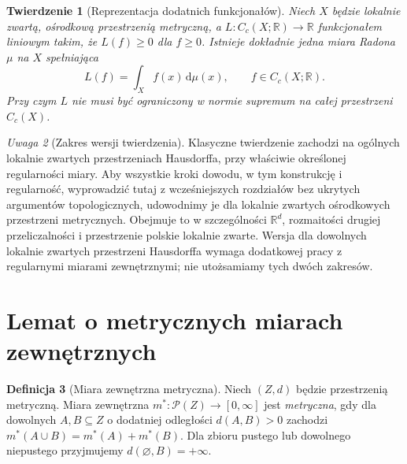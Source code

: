\documentclass[11pt,a4paper,oneside]{book}
\numberwithin{equation}{chapter}
\theoremstyle{plain}
\newtheorem{twierdzenie}{Twierdzenie}[chapter]
\theoremstyle{definition}
\newtheorem{definicja}[twierdzenie]{Definicja}
\theoremstyle{remark}
\newtheorem{uwaga}[twierdzenie]{Uwaga}
\begin{document}
\begin{twierdzenie}[Reprezentacja dodatnich funkcjonałów]
\label{thm:riesz-positive-21}
Niech $X$ będzie \emph{lokalnie zwartą, ośrodkową przestrzenią
metryczną}, a $L:C_c(X;\mathbb R)\to\mathbb R$ funkcjonałem
liniowym takim, że $L(f)\ge0$ dla $f\ge0$.
Istnieje dokładnie jedna miara Radona $\mu$ na $X$ spełniająca
\begin{equation}\label{eq:riesz-representation-21}
 L(f)=\int_X f(x)\,\mathrm d\mu(x),\qquad f\in C_c(X;\mathbb R).
\end{equation}
Przy czym $L$ nie musi być ograniczony w normie supremum na
całej przestrzeni $C_c(X)$.
\end{twierdzenie}

\begin{uwaga}[Zakres wersji twierdzenia]
Klasyczne twierdzenie zachodzi na ogólnych lokalnie zwartych
przestrzeniach Hausdorffa, przy właściwie określonej regularności
miary. Aby wszystkie kroki dowodu, w tym konstrukcję i regularność,
wyprowadzić tutaj z wcześniejszych rozdziałów bez ukrytych
argumentów topologicznych, udowodnimy je dla lokalnie zwartych
ośrodkowych przestrzeni metrycznych. Obejmuje to w szczególności
$\mathbb R^d$, rozmaitości drugiej przeliczalności i przestrzenie
polskie lokalnie zwarte. Wersja dla dowolnych lokalnie zwartych
przestrzeni Hausdorffa wymaga dodatkowej pracy z regularnymi
miarami zewnętrznymi; nie utożsamiamy tych dwóch zakresów.
\end{uwaga}

\section{Lemat o metrycznych miarach zewnętrznych}
\begin{definicja}[Miara zewnętrzna metryczna]
\label{def:metric-outer-21}
Niech $(Z,d)$ będzie przestrzenią metryczną.
Miara zewnętrzna $m^*:\mathcal P(Z)\to[0,\infty]$
jest \emph{metryczna}, gdy dla dowolnych $A,B\subseteq Z$
o dodatniej odległości $d(A,B)>0$ zachodzi
$m^*(A\cup B)=m^*(A)+m^*(B)$.
Dla zbioru pustego lub dowolnego niepustego przyjmujemy
$d(\varnothing,B)=+\infty$.
\end{definicja}
\end{document}
